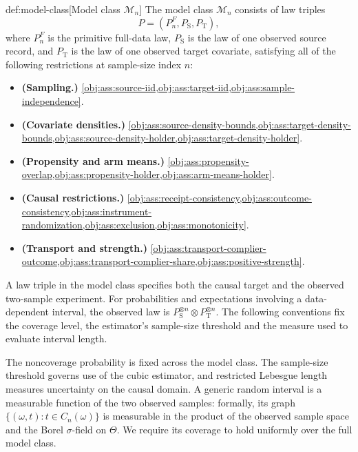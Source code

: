 \begin{definitionv}{def:model-class}[Model class $\mathcal M_n$]
The model class \(\mathcal M_n\) consists of law triples
\[
P=(P_n^F,P_{\mathrm S},P_{\mathrm T}),
\]
where \(P_n^F\) is the primitive full-data law, \(P_{\mathrm S}\) is the law of one observed source record, and \(P_{\mathrm T}\) is the law of one observed target covariate, satisfying all of the following restrictions at sample-size index \(n\):
\begin{itemize}
\item \textbf{(Sampling.)} \cref{obj:ass:source-iid,obj:ass:target-iid,obj:ass:sample-independence}.
\item \textbf{(Covariate densities.)} \cref{obj:ass:source-density-bounds,obj:ass:target-density-bounds,obj:ass:source-density-holder,obj:ass:target-density-holder}.
\item \textbf{(Propensity and arm means.)} \cref{obj:ass:propensity-overlap,obj:ass:propensity-holder,obj:ass:arm-means-holder}.
\item \textbf{(Causal restrictions.)} \cref{obj:ass:receipt-consistency,obj:ass:outcome-consistency,obj:ass:instrument-randomization,obj:ass:exclusion,obj:ass:monotonicity}.
\item \textbf{(Transport and strength.)} \cref{obj:ass:transport-complier-outcome,obj:ass:transport-complier-share,obj:ass:positive-strength}.
\end{itemize}
\end{definitionv}

A law triple  in the model class  specifies both the causal target and the observed two-sample experiment. For probabilities and expectations involving a data-dependent interval, the observed law is \(P_{\mathrm S}^{\otimes n}\otimes P_{\mathrm T}^{\otimes n}\). The following conventions fix the coverage level, the estimator's sample-size threshold and the measure used to evaluate interval length.



The noncoverage probability  is fixed across the model class. The sample-size threshold  governs use of the cubic estimator, and restricted Lebesgue length  measures uncertainty on the causal domain. A generic random interval  is a measurable function of the two observed samples: formally, its graph \(\{(\omega,t):t\in C_n(\omega)\}\) is measurable in the product of the observed sample space and the Borel \(\sigma\)-field on \(\Theta\). We require its coverage to hold uniformly over the full model class.

